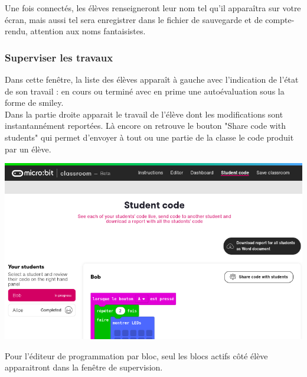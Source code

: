 \begin{remarque}
    Une fois connectés, les élèves renseigneront leur nom tel qu'il apparaîtra sur votre écran,
    mais aussi tel sera enregistrer dans le fichier de sauvegarde et de compte-rendu, attention
    aux noms fantaisistes.
    
\end{remarque}

\vspace{5mm}

\subsubsection{Superviser les travaux}

\begin{methode}
        Dans cette fenêtre, la liste des élèves apparaît à gauche avec l'indication 
        de l'état de son travail : en cours ou terminé avec en prime une autoévaluation sous la
        forme de smiley.\\
        Dans la partie droite apparait le travail de l'élève dont les modifications sont instantannément
        reportées. Là encore on retrouve le bouton "Share code with students" qui permet d'envoyer à tout
        ou une partie de la classe le code produit par un élève.

    \vspace{5mm}
    
    \centerline{\includegraphics[width=0.6\linewidth]{res/classroom_studentCode2.png}}
    


\end{methode}

\begin{remarque}
    Pour l'éditeur de programmation par bloc, seul les blocs actifs côté élève
    apparaitront dans la fenêtre de supervision.
    
\end{remarque}


\newpage
\vspace{5mm}~\\

